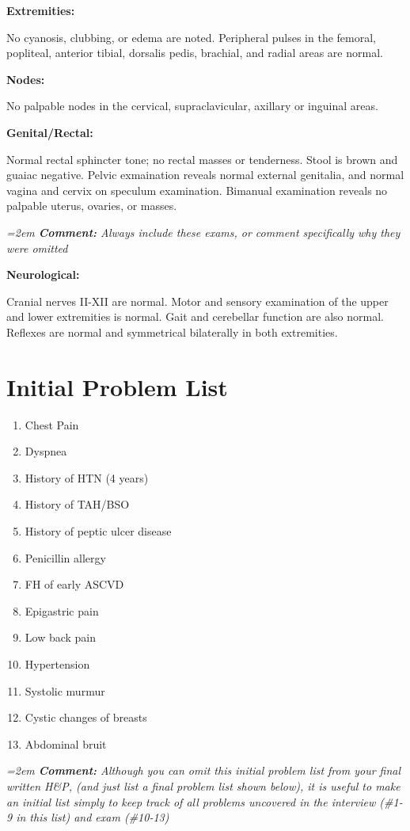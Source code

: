 \documentclass[11pt]{article}
\newcommand{\cm}[1]{%
  \par\nopagebreak\vspace{-0.2em}%
  \begingroup\small\itshape\color{cmtcolor}%
  \hangindent=2em \hangafter=0 \hspace*{1.2em}\textbf{Comment:} #1\par%
  \endgroup}
\newcommand{\lbl}[1]{\textbf{#1}\par\nopagebreak}
\begin{document}
\lbl{Extremities:}
No cyanosis, clubbing, or edema are noted. Peripheral pulses in the femoral, popliteal, anterior tibial, dorsalis pedis, brachial, and radial areas are normal.

\lbl{Nodes:}
No palpable nodes in the cervical, supraclavicular, axillary or inguinal areas.

\lbl{Genital/Rectal:}
Normal rectal sphincter tone; no rectal masses or tenderness. Stool is brown and guaiac negative. Pelvic exmaination reveals normal external genitalia, and normal vagina and cervix on speculum examination. Bimanual examination reveals no palpable uterus, ovaries, or masses.
\cm{Always include these exams, or comment specifically why they were omitted}

\lbl{Neurological:}
Cranial nerves II-XII are normal. Motor and sensory examination of the upper and lower extremities is normal. Gait and cerebellar function are also normal. Reflexes are normal and symmetrical bilaterally in both extremities.

\section*{Initial Problem List}

\begin{enumerate}[nosep,leftmargin=2em,label=\arabic*.]
  \item Chest Pain
  \item Dyspnea
  \item History of HTN (4 years)
  \item History of TAH/BSO
  \item History of peptic ulcer disease
  \item Penicillin allergy
  \item FH of early ASCVD
  \item Epigastric pain
  \item Low back pain
  \item Hypertension
  \item Systolic murmur
  \item Cystic changes of breasts
  \item Abdominal bruit
\end{enumerate}
\cm{Although you can omit this initial problem list from your final written H\&P, (and just list a final problem list shown below), it is useful to make an initial list simply to keep track of all problems uncovered in the interview (\#1-9 in this list) and exam (\#10-13)}
\end{document}
